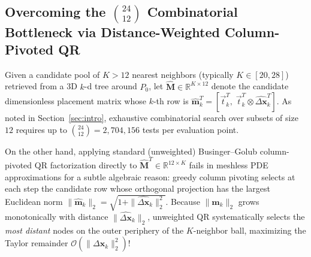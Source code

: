 \documentclass[preprint,12pt]{elsarticle}
\newcommand{\R}{\mathbb{R}}
\begin{document}
\subsection{Overcoming the $\binom{24}{12}$ Combinatorial Bottleneck via Distance-Weighted Column-Pivoted QR}
\label{subsec:weighted_qr_3d}

Given a candidate pool of $K > 12$ nearest neighbors (typically $K \in [20, 28]$) retrieved from a 3D $k$-d tree around $P_0$, let $\widehat{\mathbf{M}} \in \R^{K \times 12}$ denote the candidate dimensionless placement matrix whose $k$-th row is $\widehat{\mathbf{m}}_k^T = [\vec{t}_k^T, \; \vec{t}_k^T \otimes \widehat{\Delta\mathbf{x}}_k^T]$. As noted in Section~\ref{sec:intro}, exhaustive combinatorial search over subsets of size $12$ requires up to $\binom{24}{12} = 2{,}704{,}156$ tests per evaluation point.

On the other hand, applying standard (unweighted) Businger--Golub column-pivoted QR factorization \cite{Golub2013} directly to $\widehat{\mathbf{M}}^T \in \R^{12 \times K}$ fails in meshless PDE approximations for a subtle algebraic reason: greedy column pivoting selects at each step the candidate row whose orthogonal projection has the largest Euclidean norm $\|\widehat{\mathbf{m}}_k\|_2 = \sqrt{1 + \|\widehat{\Delta\mathbf{x}}_k\|_2^2}$. Because $\|\widehat{\mathbf{m}}_k\|_2$ grows monotonically with distance $\|\widehat{\Delta\mathbf{x}}_k\|_2$, unweighted QR systematically selects the \emph{most distant} nodes on the outer periphery of the $K$-neighbor ball, maximizing the Taylor remainder $\mathcal{O}(\|\Delta\mathbf{x}_k\|_2^2)$!
\end{document}
